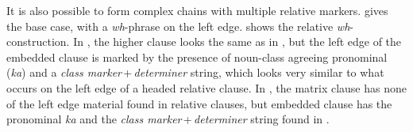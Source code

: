 \documentclass[output=paper]{langscibook}
\begin{document}
It is also possible to form complex chains with multiple relative markers.   gives the base case, with a \textit{wh}-phrase on the left edge.  shows the relative \textit{wh}-construction.  In , the higher clause looks the same as in , but the left edge of the embedded clause is marked by the presence of noun-class agreeing pronominal (\textit{ka}) and a \textit{class marker}\,+\,\textit{determiner} string, which looks very similar to what occurs on the left edge of a headed relative clause.  In , the matrix clause has none of the left edge material found in relative clauses, but embedded clause has the pronominal \textit{ka} and the \textit{class marker}\,+\,\textit{determiner} string found in .
\ea \label{ex:devlin:mult-rel}
\end{document}
